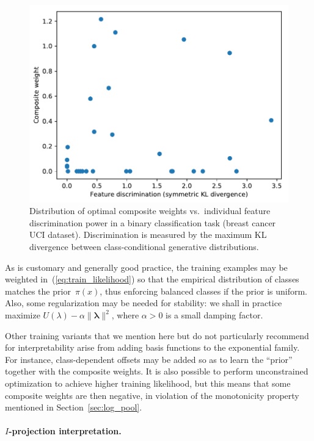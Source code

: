 \documentclass[english]{scrartcl}
\newcommand{\blambda}{{\boldsymbol{\lambda}}}
\begin{document}
\begin{figure}[!ht]
  \begin{center}
    \includegraphics[width=.7\textwidth]{disc_weight_plot.pdf}
  \end{center}
\caption{Distribution of optimal composite weights vs.~individual feature discrimination power in a binary classification task (breast cancer UCI dataset). Discrimination is measured by the maximum KL divergence between class-conditional generative distributions.}
\label{fig:disc_weight_plot}
\end{figure}

As is customary and generally good practice, the training examples may be weighted in~(\ref{eq:train_likelihood}) so that the empirical distribution of classes matches the prior~$\pi(x)$, thus enforcing balanced classes if the prior is uniform. Also, some regularization may be needed for stability: we shall in practice maximize $U(\lambda)-\alpha \|\blambda\|^2$, where $\alpha>0$ is a small damping factor.

Other training variants that we mention here but do not particularly recommend for interpretability arise from adding basis functions to the exponential family. For instance, class-dependent offsets may be added so as to learn the ``prior'' together with the composite weights. It is also possible to perform unconstrained optimization to achieve higher training likelihood, but this means that some composite weights are then negative, in violation of the monotonicity property mentioned in Section~\ref{sec:log_pool}.


\paragraph{$I$-projection interpretation.}
\end{document}
